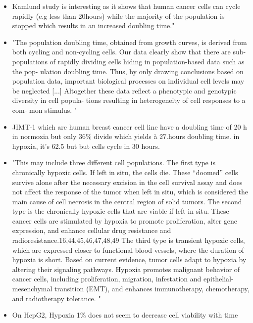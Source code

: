 \documentclass[11pt,a4paper]{article}
\begin{document}
\begin{itemize}
\item Kamlund study is interesting as it shows that human cancer cells can cycle rapidly (e.g less than 20hours) while the majority of the population is stopped which results in an increased doubling time."\cite{Kamlund2017}

\item "The population doubling time, obtained from growth
curves, is derived from both cycling and non-cycling cells. Our
data clearly show that there are sub-populations of rapidly
dividing cells hiding in population-based data such as the pop-
ulation doubling time. Thus, by only drawing conclusions
based on population data, important biological processes on
individual cell levels may be neglected [...] Altogether these data
reflect a phenotypic and genotypic diversity in cell popula-
tions resulting in heterogeneity of cell responses to a com-
mon stimulus. " \cite{Kamlund2017}

\item JIMT-1 which are human breast cancer cell line have a doubling time of 20 h in normoxia but only 36\% divide which yields à 27.hours doubling time. in hypoxia, it's 62.5 but but cells cycle in  30 hours.

\item "This may include three different cell populations. The first type is chronically hypoxic cells. If left in situ, the cells die. These “doomed” cells survive alone after the necessary excision in the cell survival assay and does not affect the response of the tumor when left in situ, which is considered the main cause of cell necrosis in the central region of solid tumors. The second type is the chronically hypoxic cells that are viable if left in situ. These cancer cells are stimulated by hypoxia to promote proliferation, alter gene expression, and enhance cellular drug resistance and radioresistance.16,44,45,46,47,48,49 The third type is transient hypoxic cells, which are expressed closer to functional blood vessels, where the duration of hypoxia is short. Based on current evidence, tumor cells adapt to hypoxia by altering their signaling pathways. Hypoxia promotes malignant behavior of cancer cells, including proliferation, migration, infestation and epithelial-mesenchymal transition (EMT), and enhances immunotherapy, chemotherapy, and radiotherapy tolerance.
" \cite{Chen2023}

\item On HepG2, Hypoxia 1\% does not seem to decrease cell viability with time \cite{Cunha2019}


\end{itemize}
\end{document}
